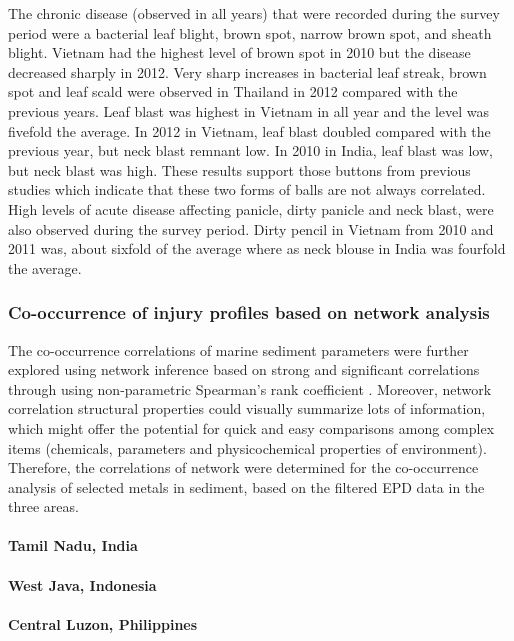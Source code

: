 The chronic disease (observed in all years) that were recorded during the survey period were a bacterial leaf blight, brown spot, narrow brown spot, and sheath blight. Vietnam had the highest level of brown spot in 2010 but the disease decreased sharply in 2012. Very sharp increases in bacterial leaf streak, brown spot and leaf scald were observed in Thailand in 2012 compared with the previous years. Leaf blast was highest in Vietnam in all year and the level was fivefold the average. In 2012 in Vietnam, leaf blast doubled compared with the previous year, but neck blast remnant low. In 2010 in India, leaf blast was low, but neck blast was high. These results support those buttons from previous studies which indicate that these two forms of balls are not always correlated. High levels of acute disease affecting panicle, dirty panicle and neck blast, were also observed during the survey period. Dirty pencil in Vietnam from 2010 and 2011 was, about sixfold of the average where as neck blouse in India was fourfold the average.



\subsubsection*{Co-occurrence of injury profiles based on network analysis}

The co-occurrence correlations of marine sediment parameters were further explored using network inference based on strong and significant correlations through using non-parametric Spearman’s rank coefficient . Moreover, network correlation structural properties could visually summarize lots of information, which might offer the potential for quick and easy comparisons among complex items (chemicals, parameters and physicochemical properties of environment). Therefore, the correlations of network were determined for the co-occurrence analysis of selected metals in sediment, based on the filtered EPD data in the three areas.


\paragraph{Tamil Nadu, India}

\paragraph{West Java, Indonesia}


\paragraph{Central Luzon, Philippines}


